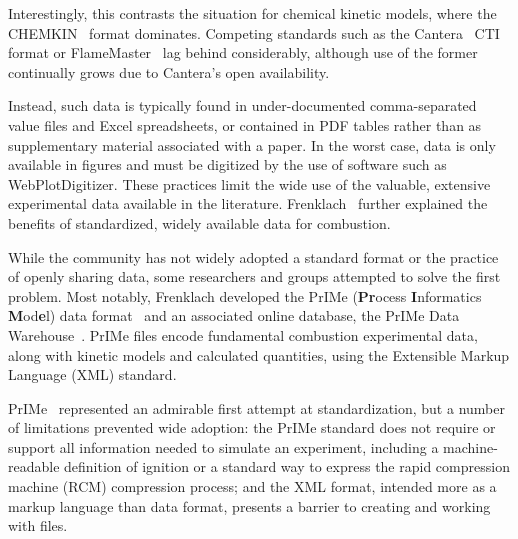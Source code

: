 \documentclass[12pt]{ussci}
\begin{document}
Interestingly, this contrasts the situation for chemical kinetic models, where the
CHEMKIN~\autocite{Kee:1996ck} format dominates. Competing standards such as the
Cantera~\autocite{Cantera:2.3.0} CTI format or FlameMaster~\autocite{FlameMaster:ref,FlameMaster:code}
lag behind considerably, although use of the former continually grows due to Cantera's
open availability.

Instead, such data is typically found in under-documented
comma-separated value files and Excel spreadsheets, or contained in PDF tables
rather than as supplementary material associated with a paper.
In the worst case, data is only available in figures and must be digitized by the use of software such as WebPlotDigitizer.
These practices limit the wide use of the valuable, extensive experimental data
available in the literature. Frenklach~\autocite{Frenklach:2007bm} further explained the
benefits of standardized, widely available data for combustion.

While the community has not widely adopted a standard format or the practice of openly 
sharing data, some researchers and groups attempted to solve the first problem.
Most notably, Frenklach developed the PrIMe (\textbf{Pr}ocess \textbf{I}nformatics
\textbf{M}od\textbf{e}l) data format~\autocite{Frenklach:2007bm,You:2011hy} and an associated
online database, the PrIMe Data Warehouse~\autocite{PrIMe}. PrIMe files encode fundamental
combustion experimental data, along with kinetic models and calculated quantities,
using the Extensible Markup Language (XML) standard.

PrIMe~\autocite{Frenklach:2007bm,You:2011hy} represented an admirable  first attempt at standardization, but a number of limitations
prevented wide adoption: the PrIMe standard does not require or support all information
needed to simulate an experiment, including a machine-readable definition of ignition or a
standard way to express the rapid compression machine (RCM) compression process; and
the XML format, intended more as a markup language than data format, presents a barrier
to creating and working with files.
\end{document}
